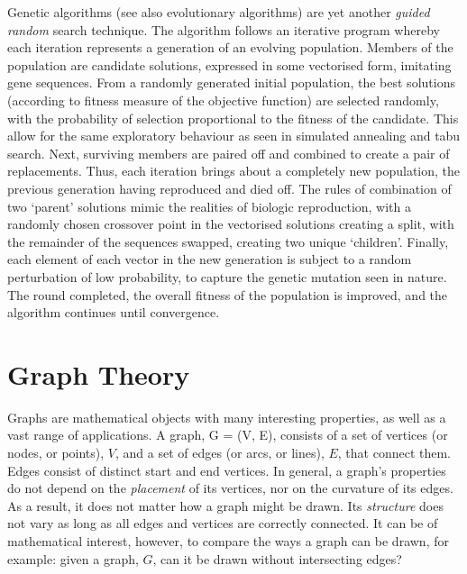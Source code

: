 \documentclass[11pt]{amsart}
\begin{document}
Genetic algorithms (see also evolutionary algorithms) are yet another \emph{guided random} search technique. The algorithm follows an iterative program whereby each iteration represents a generation of an evolving population. Members of the population are candidate solutions, expressed in some vectorised form, imitating gene sequences. From a randomly generated initial population, the best solutions (according to fitness measure of the objective function) are selected randomly, with the probability of selection proportional to the fitness of the candidate. This allow for the same exploratory behaviour as seen in simulated annealing and tabu search. Next, surviving members are paired off and combined to create a pair of replacements. Thus, each iteration brings about a completely new population, the previous generation having reproduced and died off. The rules of combination of two `parent' solutions mimic the realities of biologic reproduction, with a randomly chosen crossover point in the vectorised solutions creating a split, with the remainder of the sequences swapped, creating two unique `children'. Finally, each element of each vector in the new generation is subject to a random perturbation of low probability, to capture the genetic mutation seen in nature. The round completed, the overall fitness of the population is improved, and the algorithm continues until convergence.

\section{Graph Theory}
Graphs are mathematical objects with many interesting properties, as well as a vast range of applications. A graph, G = (V, E), consists of a set of vertices (or nodes, or points), $V$, and a set of edges (or arcs, or lines), $E$, that connect them. Edges consist of distinct start and end vertices. In general, a graph's properties do not depend on the \emph{placement} of its vertices, nor on the curvature of its edges. As a result, it does not matter how a graph might be drawn. Its \emph{structure} does not vary as long as all edges and vertices are correctly connected. It can be of mathematical interest, however, to compare the ways a graph can be drawn, for example: given a graph, $G$, can it be drawn without intersecting edges?
\end{document}
